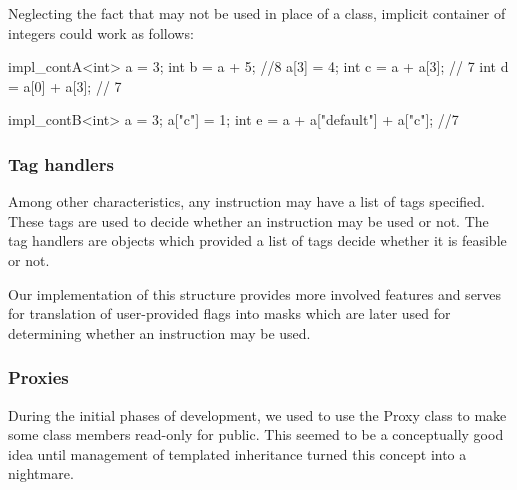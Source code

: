   Neglecting the fact that  may not be used in place of a class, implicit container of integers could work as follows:
\mybeginfig
\begin{code}
impl_contA<int> a = 3;
int b = a + 5; //8
a[3] = 4;
int c = a + a[3]; // 7
int d = a[0] + a[3]; // 7

impl_contB<int> a = 3;
a["c"] = 1;
int e = a + a["default"] + a["c"]; //7
\end{code}

\subsubsection{Tag handlers}
  Among other characteristics, any instruction may have a list of tags specified. These tags are used to decide whether an instruction may be used or not. The tag handlers are objects which provided a list of tags decide whether it is feasible or not. 

  
  Our implementation of this structure provides more involved features and serves for translation of user-provided flags into masks which are later used for determining whether an instruction may be used.

\subsubsection{Proxies}
  During the initial phases of development, we used to use the Proxy class to make some class members read-only for public. This seemed to be a conceptually good idea until management of templated inheritance turned this concept into a nightmare. 


